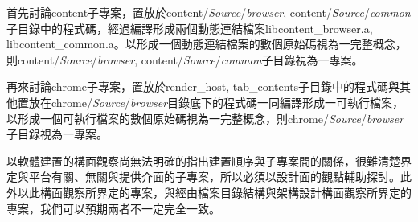 首先討論content子專案，置放於content\-/\textit{Source}\-/\textit{browser}\-, content\-/\textit{Source}\-/\textit{common}\-子目錄中的程式碼，經過編譯形成兩個動態連結檔案libcontent\_browser.a, libcontent\_common.a。以形成一個動態連結檔案的數個原始碼視為一完整概念，則content\-/\textit{Source}\-/\textit{browser}\-, content\-/\textit{Source}\-/\textit{common}\-子目錄視為一專案。

再來討論chrome子專案，置放於render\_host, tab\_contents子目錄中的程式碼與其他置放在chrome\-/\textit{Source}\-/\textit{browser}\-目錄底下的程式碼一同編譯形成一可執行檔案，以形成一個可執行檔案的數個原始碼視為一完整概念，則chrome\-/\textit{Source}\-/\textit{browser}\-子目錄視為一專案。

以軟體建置的構面觀察尚無法明確的指出建置順序與子專案間的關係，很難清楚界定與平台有關、無關與提供介面的子專案，所以必須以設計面的觀點輔助探討。此外以此構面觀察所界定的專案，與經由檔案目錄結構與架構設計構面觀察所界定的專案，我們可以預期兩者不一定完全一致。





